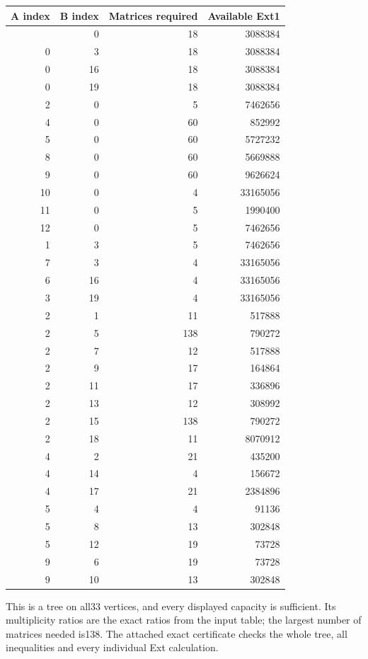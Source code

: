 \begin{longtable}[]{@{}rrrr@{}}
\toprule\noalign{}
A index & B index & Matrices required & Available Ext1 \\
\midrule\noalign{}
\endhead
\bottomrule\noalign{}
\endlastfoot
0 & 0 & 18 & 3088384 \\
0 & 3 & 18 & 3088384 \\
0 & 16 & 18 & 3088384 \\
0 & 19 & 18 & 3088384 \\
2 & 0 & 5 & 7462656 \\
4 & 0 & 60 & 852992 \\
5 & 0 & 60 & 5727232 \\
8 & 0 & 60 & 5669888 \\
9 & 0 & 60 & 9626624 \\
10 & 0 & 4 & 33165056 \\
11 & 0 & 5 & 1990400 \\
12 & 0 & 5 & 7462656 \\
1 & 3 & 5 & 7462656 \\
7 & 3 & 4 & 33165056 \\
6 & 16 & 4 & 33165056 \\
3 & 19 & 4 & 33165056 \\
2 & 1 & 11 & 517888 \\
2 & 5 & 138 & 790272 \\
2 & 7 & 12 & 517888 \\
2 & 9 & 17 & 164864 \\
2 & 11 & 17 & 336896 \\
2 & 13 & 12 & 308992 \\
2 & 15 & 138 & 790272 \\
2 & 18 & 11 & 8070912 \\
4 & 2 & 21 & 435200 \\
4 & 14 & 4 & 156672 \\
4 & 17 & 21 & 2384896 \\
5 & 4 & 4 & 91136 \\
5 & 8 & 13 & 302848 \\
5 & 12 & 19 & 73728 \\
9 & 6 & 19 & 73728 \\
9 & 10 & 13 & 302848 \\
\end{longtable}

This is a tree on all33 vertices, and every displayed capacity is
sufficient. Its multiplicity ratios are the exact ratios from the input
table; the largest number of matrices needed is138. The attached exact
certificate checks the whole tree, all inequalities and every individual Ext
calculation.

